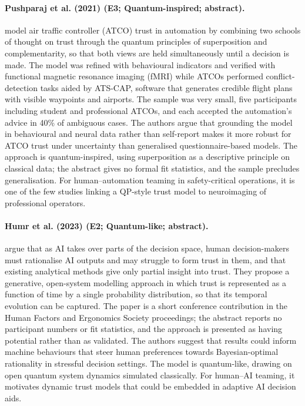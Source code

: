 \documentclass[10pt,a4paper]{article}
\begin{document}
\paragraph{Pushparaj et al. (2021) (E3; Quantum-inspired; abstract).} \citet{Pushparaj2021} model air traffic controller (ATCO) trust in automation by combining two schools of thought on trust through the quantum principles of superposition and complementarity, so that both views are held simultaneously until a decision is made. The model was refined with behavioural indicators and verified with functional magnetic resonance imaging (fMRI) while ATCOs performed conflict-detection tasks aided by ATS-CAP, software that generates credible flight plans with visible waypoints and airports. The sample was very small, five participants including student and professional ATCOs, and each accepted the automation's advice in 40\% of ambiguous cases. The authors argue that grounding the model in behavioural and neural data rather than self-report makes it more robust for ATCO trust under uncertainty than generalised questionnaire-based models. The approach is quantum-inspired, using superposition as a descriptive principle on classical data; the abstract gives no formal fit statistics, and the sample precludes generalisation. For human--automation teaming in safety-critical operations, it is one of the few studies linking a QP-style trust model to neuroimaging of professional operators.

\paragraph{Humr et al. (2023) (E2; Quantum-like; abstract).} \citet{Humr2023} argue that as AI takes over parts of the decision space, human decision-makers must rationalise AI outputs and may struggle to form trust in them, and that existing analytical methods give only partial insight into trust. They propose a generative, open-system modelling approach in which trust is represented as a function of time by a single probability distribution, so that its temporal evolution can be captured. The paper is a short conference contribution in the Human Factors and Ergonomics Society proceedings; the abstract reports no participant numbers or fit statistics, and the approach is presented as having potential rather than as validated. The authors suggest that results could inform machine behaviours that steer human preferences towards Bayesian-optimal rationality in stressful decision settings. The model is quantum-like, drawing on open quantum system dynamics simulated classically. For human--AI teaming, it motivates dynamic trust models that could be embedded in adaptive AI decision aids.
\end{document}
